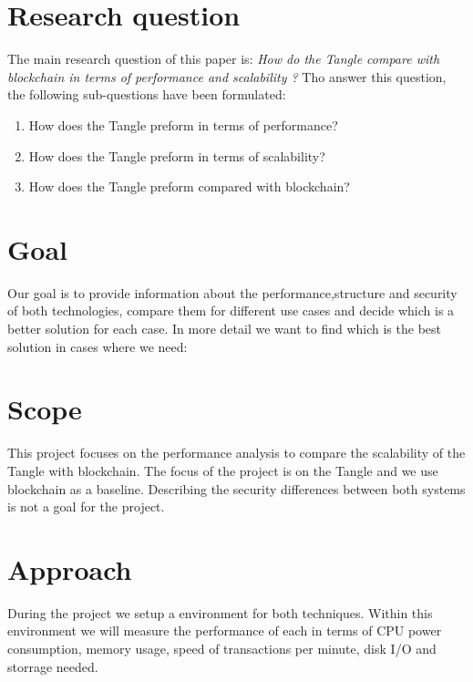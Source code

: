 \documentclass[journal]{IEEEtran}
\begin{document}
\section{Research question} 
The main research question of this paper is: 
\newline
\newline
\textit{How do the Tangle compare with blockchain in terms of performance and scalability ? }
\newline
\newline
Tho answer this question, the following sub-questions have been formulated:
\begin{enumerate}
\item How does the Tangle preform in terms of performance?
\item How does the Tangle preform in terms of scalability?
\item How does the Tangle preform compared with blockchain?
\end{enumerate}

\section{Goal}
Our goal is to provide information about the performance,structure and security of both technologies, compare them for different use cases and decide which is a better solution for each case. In more detail we want to find which is the best solution in cases where we need:

\section{Scope}
This project focuses on the performance analysis to compare the scalability of the Tangle with blockchain. The focus of the project is on the Tangle and we use blockchain as a baseline. Describing the security differences between both systems is not a goal for the project. 

\section{Approach}
During the project we setup a environment for both techniques. Within this environment we will measure the performance of each in terms of CPU power consumption, memory usage, speed of transactions per minute, disk I/O and storrage needed. 
\end{document}
